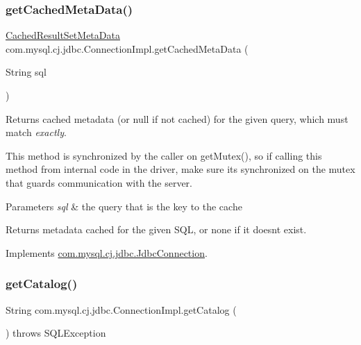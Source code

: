 \subsubsection{\texorpdfstring{get\+Cached\+Meta\+Data()}{getCachedMetaData()}}
{\footnotesize\ttfamily \mbox{\hyperlink{interfacecom_1_1mysql_1_1cj_1_1jdbc_1_1result_1_1_cached_result_set_meta_data}{Cached\+Result\+Set\+Meta\+Data}} com.\+mysql.\+cj.\+jdbc.\+Connection\+Impl.\+get\+Cached\+Meta\+Data (\begin{DoxyParamCaption}\item[{String}]{sql }\end{DoxyParamCaption})}

Returns cached metadata (or null if not cached) for the given query, which must match {\itshape exactly}.

This method is synchronized by the caller on get\+Mutex(), so if calling this method from internal code in the driver, make sure it\textquotesingle{}s synchronized on the mutex that guards communication with the server.


\begin{DoxyParams}{Parameters}
{\em sql} & the query that is the key to the cache\\
\hline
\end{DoxyParams}
\begin{DoxyReturn}{Returns}
metadata cached for the given S\+QL, or none if it doesn\textquotesingle{}t exist. 
\end{DoxyReturn}


Implements \mbox{\hyperlink{interfacecom_1_1mysql_1_1cj_1_1jdbc_1_1_jdbc_connection_a248df459ef314e3a79257c7bd6dc560a}{com.\+mysql.\+cj.\+jdbc.\+Jdbc\+Connection}}.

\mbox{\label{classcom_1_1mysql_1_1cj_1_1jdbc_1_1_connection_impl_a0873bb4479be9327023a37eaace6b45f}} 
\subsubsection{\texorpdfstring{get\+Catalog()}{getCatalog()}}
{\footnotesize\ttfamily String com.\+mysql.\+cj.\+jdbc.\+Connection\+Impl.\+get\+Catalog (\begin{DoxyParamCaption}{ }\end{DoxyParamCaption}) throws S\+Q\+L\+Exception}

